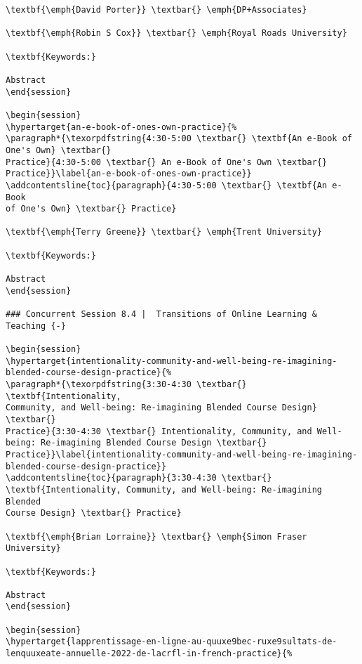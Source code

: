 \documentclass[
]{book}
\begin{document}
\begin{verbatim}
\textbf{\emph{David Porter}} \textbar{} \emph{DP+Associates}

\textbf{\emph{Robin S Cox}} \textbar{} \emph{Royal Roads University}

\textbf{Keywords:}

Abstract
\end{session}

\begin{session}
\hypertarget{an-e-book-of-ones-own-practice}{%
\paragraph*{\texorpdfstring{4:30-5:00 \textbar{} \textbf{An e-Book of
One's Own} \textbar{}
Practice}{4:30-5:00 \textbar{} An e-Book of One's Own \textbar{} Practice}}\label{an-e-book-of-ones-own-practice}}
\addcontentsline{toc}{paragraph}{4:30-5:00 \textbar{} \textbf{An e-Book
of One's Own} \textbar{} Practice}

\textbf{\emph{Terry Greene}} \textbar{} \emph{Trent University}

\textbf{Keywords:}

Abstract
\end{session}

### Concurrent Session 8.4 |  Transitions of Online Learning & Teaching {-}

\begin{session}
\hypertarget{intentionality-community-and-well-being-re-imagining-blended-course-design-practice}{%
\paragraph*{\texorpdfstring{3:30-4:30 \textbar{} \textbf{Intentionality,
Community, and Well-being: Re-imagining Blended Course Design}
\textbar{}
Practice}{3:30-4:30 \textbar{} Intentionality, Community, and Well-being: Re-imagining Blended Course Design \textbar{} Practice}}\label{intentionality-community-and-well-being-re-imagining-blended-course-design-practice}}
\addcontentsline{toc}{paragraph}{3:30-4:30 \textbar{}
\textbf{Intentionality, Community, and Well-being: Re-imagining Blended
Course Design} \textbar{} Practice}

\textbf{\emph{Brian Lorraine}} \textbar{} \emph{Simon Fraser University}

\textbf{Keywords:}

Abstract
\end{session}

\begin{session}
\hypertarget{lapprentissage-en-ligne-au-quuxe9bec-ruxe9sultats-de-lenquuxeate-annuelle-2022-de-lacrfl-in-french-practice}{%

\end{verbatim}
\end{document}
